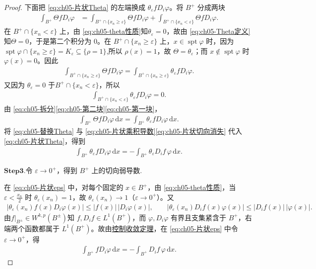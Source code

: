 \documentclass[../../main.tex]{subfiles}
\begin{document}
\begin{proof}
下面把 \eqref{eq:ch05-片状Theta} 的左端换成 $\theta_{\varepsilon}fD_i\varphi$。将 $B^{+}$ 分成两块
\begin{align}
\int_{B^{+}}\Theta fD_i\varphi
&=\int_{B^{+}\cap\{x_n\geqslant\varepsilon\}}\Theta fD_i\varphi
+\int_{B^{+}\cap\{x_n<\varepsilon\}}\Theta fD_i\varphi.
\label{eq:ch05-拆分}
\end{align}
在 $B^{+}\cap\{x_n<\varepsilon\}$ 上，由 \eqref{eq:ch05-theta性质}知$\theta_{\varepsilon}=0$，故由 \eqref{eq:ch05-Theta定义}知$\Theta=0$，于是第二个积分为 $0$。在 $B^{+}\cap\{x_n\geqslant\varepsilon\}$ 上，$x\in\operatorname{spt}\varphi$ 时，因为 $\operatorname{spt}\varphi\cap\{x_n\geqslant\varepsilon\}=K_{\varepsilon}\subseteq\{\rho=1\}$,所以 $\rho(x)=1$，故 $\Theta=\theta_{\varepsilon}$；而 $x\notin\operatorname{spt}\varphi$ 时 $\varphi(x)=0$。因此
\begin{align}
\int_{B^{+}\cap\{x_n\geqslant\varepsilon\}}\Theta fD_i\varphi
=\int_{B^{+}\cap\{x_n\geqslant\varepsilon\}}\theta_{\varepsilon}fD_i\varphi.
\label{eq:ch05-第一块}
\end{align}
又因为 $\theta_{\varepsilon}=0$ 于$B^{+}\cap\{x_n<\varepsilon\}$，所以
\begin{align}
\int_{B^{+}\cap\{x_n<\varepsilon\}}\theta_{\varepsilon}fD_i\varphi=0.
\label{eq:ch05-第二块}
\end{align}
由 \eqref{eq:ch05-拆分}\eqref{eq:ch05-第二块}\eqref{eq:ch05-第一块}，
\begin{align}
\int_{B^{+}}\Theta fD_i\varphi\,\mathrm{d}x
=\int_{B^{+}}\theta_{\varepsilon}fD_i\varphi\,\mathrm{d}x.
\label{eq:ch05-替换Theta}
\end{align}
将 \eqref{eq:ch05-替换Theta} 与 \eqref{eq:ch05-片状乘积导数}\eqref{eq:ch05-片状切向消失} 代入 \eqref{eq:ch05-片状Theta}，得到
\begin{align}
\int_{B^{+}}\theta_{\varepsilon}fD_i\varphi\,\mathrm{d}x
=-\int_{B^{+}}\theta_{\varepsilon}D_if\,\varphi\,\mathrm{d}x.
\label{eq:ch05-片状eps}
\end{align}

\noindent$\mathbf{Step}\bm{3}$.{\heiti 令 $\varepsilon\to0^{+}$，得到 $B^{+}$ 上的切向弱导数.}

在 \eqref{eq:ch05-片状eps} 中，对每个固定的 $x\in B^{+}$，由 \eqref{eq:ch05-theta性质}，当 $\varepsilon<\frac{x_n}{2}$ 时 $\theta_{\varepsilon}(x_n)=1$，故 $\theta_{\varepsilon}(x_n)\to1$（$\varepsilon\to0^{+}$）。又
\begin{align*}
|\theta_{\varepsilon}(x_n)f(x)D_i\varphi(x)|\leqslant|f(x)|\,|D_i\varphi(x)|,\qquad
|\theta_{\varepsilon}(x_n)D_if(x)\varphi(x)|\leqslant|D_if(x)|\,|\varphi(x)|.
\end{align*}
由$f|_{B^{\pm}}\in W^{k,p}(B^{\pm})$知 $f,D_if\in L^{1}(B^{+})$，而 $\varphi,D_i\varphi$ 有界且支集紧含于 $B^{+}$，右端两个函数都属于 $L^{1}(B^{+})$。故由\hyperref[Real Analysis-theorem:控制收敛定理]{控制收敛定理}，在 \eqref{eq:ch05-片状eps} 中令 $\varepsilon\to0^{+}$，得
\begin{align}
\int_{B^{+}}fD_i\varphi\,\mathrm{d}x
=-\int_{B^{+}}D_if\,\varphi\,\mathrm{d}x.
\label{eq:ch05-片状切向}
\end{align}


\end{proof}
\end{document}
